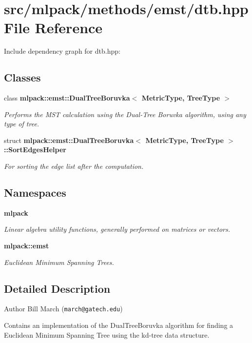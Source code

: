 \section{src/mlpack/methods/emst/dtb.hpp File Reference}
\label{dtb_8hpp}
Include dependency graph for dtb.\-hpp\-:
\subsection*{Classes}
\begin{DoxyCompactItemize}
\item 
class {\bf mlpack\-::emst\-::\-Dual\-Tree\-Boruvka$<$ Metric\-Type, Tree\-Type $>$}
\begin{DoxyCompactList}\small\item\em Performs the M\-S\-T calculation using the Dual-\/\-Tree Boruvka algorithm, using any type of tree. \end{DoxyCompactList}\item 
struct {\bf mlpack\-::emst\-::\-Dual\-Tree\-Boruvka$<$ Metric\-Type, Tree\-Type $>$\-::\-Sort\-Edges\-Helper}
\begin{DoxyCompactList}\small\item\em For sorting the edge list after the computation. \end{DoxyCompactList}\end{DoxyCompactItemize}
\subsection*{Namespaces}
\begin{DoxyCompactItemize}
\item 
{\bf mlpack}
\begin{DoxyCompactList}\small\item\em Linear algebra utility functions, generally performed on matrices or vectors. \end{DoxyCompactList}\item 
{\bf mlpack\-::emst}
\begin{DoxyCompactList}\small\item\em Euclidean Minimum Spanning Trees. \end{DoxyCompactList}\end{DoxyCompactItemize}


\subsection{Detailed Description}
\begin{DoxyAuthor}{Author}
Bill March ({\tt march@gatech.\-edu})
\end{DoxyAuthor}
Contains an implementation of the Dual\-Tree\-Boruvka algorithm for finding a Euclidean Minimum Spanning Tree using the kd-\/tree data structure.


